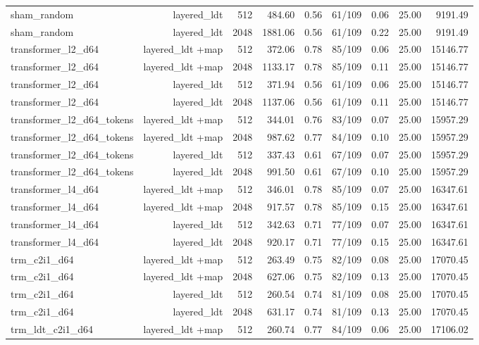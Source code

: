 \begin{table}[t]
\begin{adjustbox}{max width=\linewidth}
\begin{tabular}{lrrrrrrrr}
sham\_random & layered\_ldt & 512 & 484.60 & 0.56 & 61/109 & 0.06 & 25.00 & 9191.49 \\
sham\_random & layered\_ldt & 2048 & 1881.06 & 0.56 & 61/109 & 0.22 & 25.00 & 9191.49 \\
transformer\_l2\_d64 & layered\_ldt +map & 512 & 372.06 & 0.78 & 85/109 & 0.06 & 25.00 & 15146.77 \\
transformer\_l2\_d64 & layered\_ldt +map & 2048 & 1133.17 & 0.78 & 85/109 & 0.11 & 25.00 & 15146.77 \\
transformer\_l2\_d64 & layered\_ldt & 512 & 371.94 & 0.56 & 61/109 & 0.06 & 25.00 & 15146.77 \\
transformer\_l2\_d64 & layered\_ldt & 2048 & 1137.06 & 0.56 & 61/109 & 0.11 & 25.00 & 15146.77 \\
transformer\_l2\_d64\_tokens & layered\_ldt +map & 512 & 344.01 & 0.76 & 83/109 & 0.07 & 25.00 & 15957.29 \\
transformer\_l2\_d64\_tokens & layered\_ldt +map & 2048 & 987.62 & 0.77 & 84/109 & 0.10 & 25.00 & 15957.29 \\
transformer\_l2\_d64\_tokens & layered\_ldt & 512 & 337.43 & 0.61 & 67/109 & 0.07 & 25.00 & 15957.29 \\
transformer\_l2\_d64\_tokens & layered\_ldt & 2048 & 991.50 & 0.61 & 67/109 & 0.10 & 25.00 & 15957.29 \\
transformer\_l4\_d64 & layered\_ldt +map & 512 & 346.01 & 0.78 & 85/109 & 0.07 & 25.00 & 16347.61 \\
transformer\_l4\_d64 & layered\_ldt +map & 2048 & 917.57 & 0.78 & 85/109 & 0.15 & 25.00 & 16347.61 \\
transformer\_l4\_d64 & layered\_ldt & 512 & 342.63 & 0.71 & 77/109 & 0.07 & 25.00 & 16347.61 \\
transformer\_l4\_d64 & layered\_ldt & 2048 & 920.17 & 0.71 & 77/109 & 0.15 & 25.00 & 16347.61 \\
trm\_c2i1\_d64 & layered\_ldt +map & 512 & 263.49 & 0.75 & 82/109 & 0.08 & 25.00 & 17070.45 \\
trm\_c2i1\_d64 & layered\_ldt +map & 2048 & 627.06 & 0.75 & 82/109 & 0.13 & 25.00 & 17070.45 \\
trm\_c2i1\_d64 & layered\_ldt & 512 & 260.54 & 0.74 & 81/109 & 0.08 & 25.00 & 17070.45 \\
trm\_c2i1\_d64 & layered\_ldt & 2048 & 631.17 & 0.74 & 81/109 & 0.13 & 25.00 & 17070.45 \\
trm\_ldt\_c2i1\_d64 & layered\_ldt +map & 512 & 260.74 & 0.77 & 84/109 & 0.06 & 25.00 & 17106.02 \\

\end{tabular}
\end{adjustbox}
\end{table}

